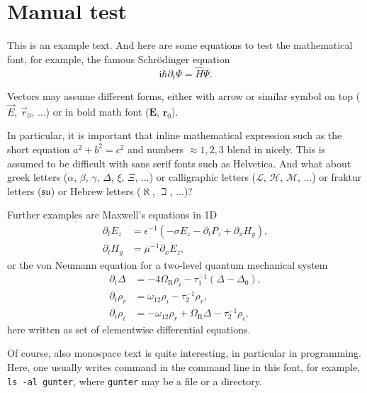 \documentclass{scrartcl}
\begin{document}
\section{Manual test}

This is an example text. And here are some equations to test the mathematical
font, for example, the famous Schrödinger equation
\begin{equation}
  \mathrm{i} \hbar \partial_t \Psi = \hat H \Psi.
\end{equation}

Vectors may assume different forms, either with arrow or similar symbol on
top ($\vec E$, $\vec r_0$, ...) or in bold math font ($\mathbf{E}$,
$\mathbf{r}_0$).

In particular, it is important that inline mathematical expression such as
the short equation $a^2 + b^2 = c^2$ and numbers $\approx 1, 2, 3$ blend in
nicely.
This is assumed to be difficult with sans serif fonts such as Helvetica. And
what about greek letters ($\alpha$, $\beta$, $\gamma$, $\Delta$, $\xi$,
$\Xi$, ...) or calligraphic letters ($\mathcal{L}$, $\mathcal{H}$,
$\mathcal{M}$, ...) or fraktur letters ($\mathfrak{su}$) or Hebrew letters
($\aleph$, $\beth$, ...)?

Further examples are Maxwell's equations in 1D
\begin{subequations}
  \begin{align}
    \partial_t E_z & = \epsilon^{-1}
    \left( -\sigma E_z - \partial_t P_z + \partial_x H_y \right), \\
    \partial_t H_y & = \mu^{-1} \partial_x E_z,
  \end{align}
\end{subequations}
or the von Neumann equation for a two-level quantum mechanical system
\begin{subequations}
  \begin{align}
    \partial_t \Delta & = -4\Omega_\mathrm{R} \rho_i - \tau_1^{-1}
    \left( \Delta - \Delta_0 \right),                                      \\
    \partial_t \rho_r & = \omega_{12} \rho_i - \tau_{2}^{-1} \rho_r,       \\
    \partial_t \rho_i & = -\omega_{12} \rho_r + \Omega_\mathrm{R} \Delta -
    \tau_{2}^{-1} \rho_i,
  \end{align}
\end{subequations}
here written as set of elementwise differential equations.

Of course, also monospace text is quite interesting, in particular in
programming. Here, one usually writes command in the command line in this
font,
for example, \texttt{ls -al gunter}, where \texttt{gunter} may be a file or a
directory.
\end{document}
